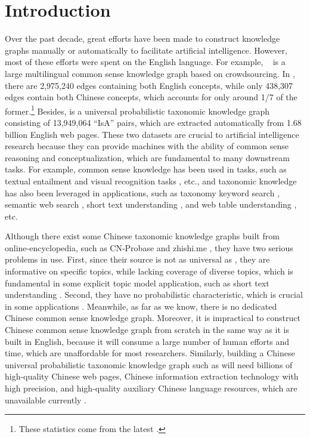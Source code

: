 \section{Introduction}
\label{sec:intro}
Over the past decade, great efforts have been made to construct knowledge graphs manually or automatically to facilitate artificial intelligence.
However, most of these efforts were spent on the English language. For example, \con~\cite{Speer2012a} is a large multilingual common sense knowledge graph based on crowdsourcing. In \con, there are 2,975,240 edges containing both English concepts, while only 438,307 edges contain both Chinese concepts, which accounts for only around 1/7 of the former.\footnote{These statistics come from the latest .} Besides, \pro \cite{Wu2012} is a universal probabilistic taxonomic knowledge graph consisting of 13,949,064 ``IsA'' pairs, which are extracted automatically from 1.68 billion English web pages. 
These two datasets are crucial to artificial intelligence research because they can provide machines with the ability of common sense reasoning and conceptualization, which are fundamental to many downstream tasks. For example, common sense knowledge has been used in tasks, such as textual entailment \cite{dagan2010recognizing,bowman2015large} and visual recognition tasks \cite{zhu2014reasoning}, etc., and taxonomic knowledge has also been leveraged in applications, such as taxonomy keyword search \cite{ding2012optimizing}, semantic web search \cite{wang2010toward}, short text understanding \cite{song2011short}, and web table understanding \cite{wang2012understanding}, etc. 

Although there exist some Chinese taxonomic knowledge graphs built from online-encyclopedia, such as CN-Probase \cite{Xu2017} and zhishi.me \cite{Niu2011}, they have two serious problems in use. First, since their source is not as universal as \pro, they are informative on specific topics, while lacking coverage of diverse topics, which is fundamental in some explicit topic model application, such as short text understanding \cite{song2011short}. 
Second, they have no probabilistic characteristic, which is crucial in some applications \cite{Cui2016,Song-ijcai-2011}. 
Meanwhile, as far as we know, there is no dedicated Chinese common sense knowledge graph.
Moreover, it is impractical to construct Chinese common sense knowledge graph from scratch in the same way as it is built in English, because it will consume a large number of human efforts and time, which are unaffordable for most researchers. Similarly, building a Chinese universal probabilistic taxonomic knowledge graph such as \pro will need billions of high-quality Chinese web pages, Chinese information extraction technology with high precision, and high-quality auxiliary Chinese language resources, which are unavailable currently \cite{Wang2015}. 

